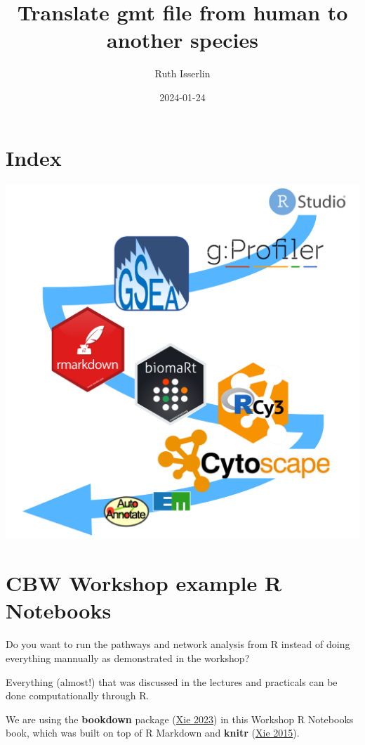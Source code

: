 \documentclass[
]{book}
\title{Translate gmt file from human to another species}
\author{Ruth Isserlin}
\date{2024-01-24}
\begin{document}
\maketitle

{
\setcounter{tocdepth}{1}
\tableofcontents
}
\hypertarget{index}{%
\chapter{Index}\label{index}}

\includegraphics{./images/cover.png}

\hypertarget{intro}{%
\chapter{CBW Workshop example R Notebooks}\label{intro}}

Do you want to run the pathways and network analysis from R instead of doing everything mannually as demonstrated in the workshop?

Everything (almost!) that was discussed in the lectures and practicals can be done computationally through R.

We are using the \textbf{bookdown} package (\protect\hyperlink{ref-R-bookdown}{Xie 2023}) in this Workshop R Notebooks book, which was built on top of R Markdown and \textbf{knitr} (\protect\hyperlink{ref-xie2015}{Xie 2015}).
\end{document}

